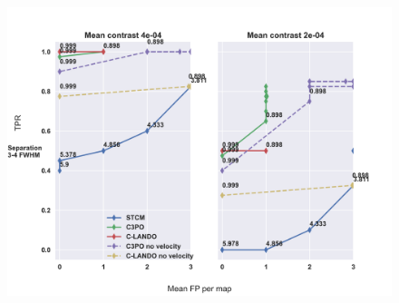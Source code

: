 \documentclass[referee]{aa} %
\begin{document}
\begin{figure}
    \centering
    \includegraphics[width=\textwidth]{Fig6_final_September.png}
\end{figure}
\end{document}
